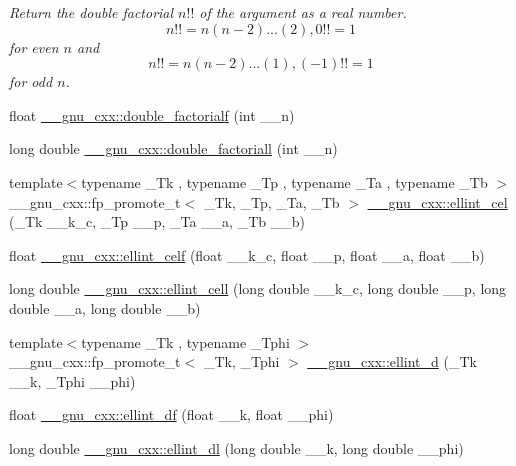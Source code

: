 \begin{DoxyCompactItemize}
\begin{DoxyCompactList}\small\item\em Return the double factorial $ n!! $ of the argument as a real number. \[ n!! = n(n-2)...(2), 0!! = 1 \] for even $ n $ and \[ n!! = n(n-2)...(1), (-1)!! = 1 \] for odd $ n $. \end{DoxyCompactList}\item 
float \hyperlink{group__gnu__math__spec__func_ga85ec284e603f32d18970bbdbb12d5150}{\+\_\+\+\_\+gnu\+\_\+cxx\+::double\+\_\+factorialf} (int \+\_\+\+\_\+n)
\item 
long double \hyperlink{group__gnu__math__spec__func_ga0366730a4a775256217ef1cd9d0c3a04}{\+\_\+\+\_\+gnu\+\_\+cxx\+::double\+\_\+factoriall} (int \+\_\+\+\_\+n)
\item 
{\footnotesize template$<$typename \+\_\+\+Tk , typename \+\_\+\+Tp , typename \+\_\+\+Ta , typename \+\_\+\+Tb $>$ }\\\+\_\+\+\_\+gnu\+\_\+cxx\+::fp\+\_\+promote\+\_\+t$<$ \+\_\+\+Tk, \+\_\+\+Tp, \+\_\+\+Ta, \+\_\+\+Tb $>$ \hyperlink{group__gnu__math__spec__func_ga6e44a0d90500e56ef4b3aba6efd7e2b0}{\+\_\+\+\_\+gnu\+\_\+cxx\+::ellint\+\_\+cel} (\+\_\+\+Tk \+\_\+\+\_\+k\+\_\+c, \+\_\+\+Tp \+\_\+\+\_\+p, \+\_\+\+Ta \+\_\+\+\_\+a, \+\_\+\+Tb \+\_\+\+\_\+b)
\item 
float \hyperlink{group__gnu__math__spec__func_ga6d8fbef7853cf37de11278b1ff7127e8}{\+\_\+\+\_\+gnu\+\_\+cxx\+::ellint\+\_\+celf} (float \+\_\+\+\_\+k\+\_\+c, float \+\_\+\+\_\+p, float \+\_\+\+\_\+a, float \+\_\+\+\_\+b)
\item 
long double \hyperlink{group__gnu__math__spec__func_gaa5add699fb2b4b02e63f8725a3a79750}{\+\_\+\+\_\+gnu\+\_\+cxx\+::ellint\+\_\+cell} (long double \+\_\+\+\_\+k\+\_\+c, long double \+\_\+\+\_\+p, long double \+\_\+\+\_\+a, long double \+\_\+\+\_\+b)
\item 
{\footnotesize template$<$typename \+\_\+\+Tk , typename \+\_\+\+Tphi $>$ }\\\+\_\+\+\_\+gnu\+\_\+cxx\+::fp\+\_\+promote\+\_\+t$<$ \+\_\+\+Tk, \+\_\+\+Tphi $>$ \hyperlink{group__gnu__math__spec__func_gad75103894786e6d7766bac4d8447b6cc}{\+\_\+\+\_\+gnu\+\_\+cxx\+::ellint\+\_\+d} (\+\_\+\+Tk \+\_\+\+\_\+k, \+\_\+\+Tphi \+\_\+\+\_\+phi)
\item 
float \hyperlink{group__gnu__math__spec__func_ga02ed50be21fdd84ad6bed003f94a9e69}{\+\_\+\+\_\+gnu\+\_\+cxx\+::ellint\+\_\+df} (float \+\_\+\+\_\+k, float \+\_\+\+\_\+phi)
\item 
long double \hyperlink{group__gnu__math__spec__func_gaa34bcb8e316f2e8b2b2bf48cd89abd98}{\+\_\+\+\_\+gnu\+\_\+cxx\+::ellint\+\_\+dl} (long double \+\_\+\+\_\+k, long double \+\_\+\+\_\+phi)

\end{DoxyCompactItemize}
